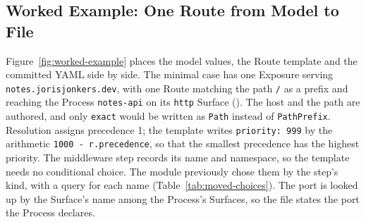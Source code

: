 \subsection{Worked Example: One Route from Model to File}
\label{sec:m2t-example}

Figure~\ref{fig:worked-example} places the model values, the Route template and the
committed YAML side by side. The minimal case has one Exposure serving
\texttt{notes.jorisjonkers.dev}, with one Route matching the path \texttt{/} as a
prefix and reaching the Process \texttt{notes-api} on its \texttt{http} Surface
(). The host and the path are
authored, and only \texttt{exact} would be written as \texttt{Path} instead of
\texttt{PathPrefix}. Resolution assigns precedence 1; the template writes
\texttt{priority: 999} by the arithmetic \texttt{1000 - r.precedence}, so that the
smallest precedence has the highest priority. The middleware step records its name
and namespace, so the template needs no conditional choice. The module previously
chose them by the step's kind, with a query for each name (Table~\ref{tab:moved-choices}). The port
is looked up by the Surface's name among the Process's Surfaces, so the file states the
port the Process declares.
